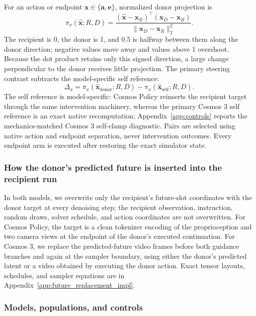 \documentclass{article}
\begin{document}
For an action or endpoint $\mathbf x\in\{\mathbf a,\mathbf e\}$, normalized donor projection is
\begin{equation}
\pi_x(\hat{\mathbf x};R,D)=
\frac{(\hat{\mathbf x}-\mathbf x_R)^\top(\mathbf x_D-\mathbf x_R)}
{\lVert\mathbf x_D-\mathbf x_R\rVert_2^2}.
\label{eq:projection}
\end{equation}
The recipient is 0, the donor is 1, and 0.5 is halfway between them along the donor direction; negative values move away and values above 1 overshoot. Because the dot product retains only this signed direction, a large change perpendicular to the donor receives little projection. The primary steering contrast subtracts the model-specific self reference:
\begin{equation}
\Delta_x=\pi_x(\hat{\mathbf x}_{\mathrm{donor}};R,D)-
\pi_x(\hat{\mathbf x}_{\mathrm{self}};R,D).
\label{eq:delta}
\end{equation}
The self reference is model-specific: Cosmos Policy reinserts the recipient target through the same intervention machinery, whereas the primary Cosmos 3 self reference is an exact native recomputation; Appendix~\ref{app:controls} reports the mechanics-matched Cosmos 3 self-clamp diagnostic. Pairs are selected using native action and endpoint separation, never intervention outcomes. Every endpoint arm is executed after restoring the exact simulator state.

\subsubsection{How the donor's predicted future is inserted into the recipient run}

In both models, we overwrite only the recipient's future-slot coordinates with the donor target at every denoising step; the recipient observation, instruction, random draws, solver schedule, and action coordinates are not overwritten. For Cosmos Policy, the target is a clean tokenizer encoding of the proprioception and two camera views at the endpoint of the donor's executed continuation. For Cosmos 3, we replace the predicted-future video frames before both guidance branches and again at the sampler boundary, using either the donor's predicted latent or a video obtained by executing the donor action. Exact tensor layouts, schedules, and sampler equations are in Appendix~\ref{app:future_replacement_impl}.

\subsubsection{Models, populations, and controls}
\end{document}
